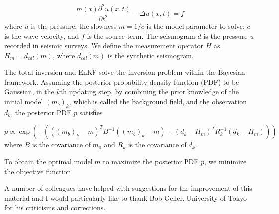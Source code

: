 \documentclass[mreferee]{gji}
\begin{document}
\begin{equation}
\frac{m(x)\partial ^2{u}(x,t)}{\partial{t^2}}-\Delta u(x,t)=f
\end{equation}
where $u$ is the pressure; the slowness $m=1/c$ is the model parameter to solve; $c$ is the wave velocity, and $f$ is the source term. The seismogram $d$ is the pressure $u$ recorded in seismic surveys. We define the measurement operator $H$ as $H_m=d_{cal}(m)$, where $d_{cal}(m)$ is the synthetic seismogram.

The total inversion and EnKF solve the inversion problem within the Bayesian framework. Assuming the posterior probability density function (PDF) to be Gaussian, in the $k$th updating step, by combining the prior knowledge of the initial model $(m_b)_k$, which is called the background field, and the observation $d_k$, the posterior PDF $p$ satisfies


\begin{equation}
p \varpropto \exp\left ( -\left ( \left ( \left ( m_b \right )_k - m \right )^T B^{-1} \left ( \left ( m_b \right )_k -m\right ) +\left ( d_k-H_m \right )^TR_k^{-1}\left ( d_k-H_m \right )\right ) \right )
\end{equation}
where $B$ is the covariance of $m_0$ and $R_k$ is the covariance of $d_k$. 

To obtain the optimal model $m$ to maximize the posterior PDF $p$, we minimize the objective function


\begin{acknowledgments}
A number of colleagues have helped with suggestions for the
improvement of this material and I would particularly like to thank
Bob Geller, University of Tokyo for his criticisms and corrections.
\end{acknowledgments}
\end{document}
